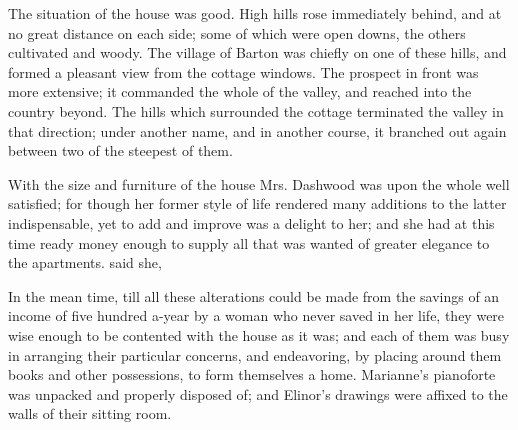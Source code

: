 The situation of the house was good. High hills rose immediately behind, and at no great distance on each side; some of which were open downs, the others cultivated and woody. The village of Barton was chiefly on one of these hills, and formed a pleasant view from the cottage windows. The prospect in front was more extensive; it commanded the whole of the valley, and reached into the country beyond. The hills which surrounded the cottage terminated the valley in that direction; under another name, and in another course, it branched out again between two of the steepest of them.

With the size and furniture of the house Mrs. Dashwood was upon the whole well satisfied; for though her former style of life rendered many additions to the latter indispensable, yet to add and improve was a delight to her; and she had at this time ready money enough to supply all that was wanted of greater elegance to the apartments.  said she, 

In the mean time, till all these alterations could be made from the savings of an income of five hundred a-year by a woman who never saved in her life, they were wise enough to be contented with the house as it was; and each of them was busy in arranging their particular concerns, and endeavoring, by placing around them books and other possessions, to form themselves a home. Marianne's pianoforte was unpacked and properly disposed of; and Elinor's drawings were affixed to the walls of their sitting room.

